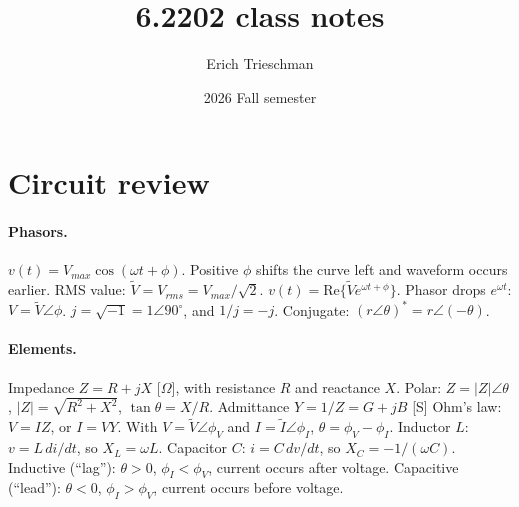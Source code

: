 \documentclass{article}
\title{6.2202 class notes}
\author{Erich Trieschman}
\date{2026 Fall semester}
\newcommand{\abs}[1]{\lvert#1\rvert}
\begin{document}

\section{Circuit review}

\paragraph{Phasors.}
$v(t) = V_{max}\cos(\omega t + \phi)$.
Positive $\phi$ shifts the curve left and waveform occurs earlier.
RMS value: $\tilde V = V_{rms} = V_{max}/\sqrt2$.
$v(t) = \text{Re}\{\tilde Ve^{\omega t + \phi}\}$.
Phasor drops $e^{\omega t}$: $V = \tilde V\angle\phi$.
$j = \sqrt{-1} = 1\angle90^\circ$, and $1/j = -j$.
Conjugate: $(r\angle\theta)^* = r\angle(-\theta)$.

\paragraph{Elements.}
Impedance $Z = R + jX$ [$\Omega$], with resistance $R$ and reactance $X$.
Polar: $Z = \abs Z\angle\theta$, $\abs Z = \sqrt{R^2 + X^2}$, $\tan\theta = X/R$.
Admittance $Y = 1/Z = G + jB$ [S]
Ohm's law: $V = IZ$, or $I = VY$.
With $V = \tilde V\angle\phi_V$ and $I = \tilde I\angle\phi_I$, $\theta = \phi_V - \phi_I$.
Inductor $L$: $v = L\,di/dt$, so $X_L = \omega L$.
Capacitor $C$: $i = C\,dv/dt$, so $X_C = -1/(\omega C)$.
Inductive (``lag''): $\theta > 0$, $\phi_I < \phi_V$, current occurs after voltage.
Capacitive (``lead''): $\theta < 0$, $\phi_I > \phi_V$, current occurs before voltage.
\end{document}
